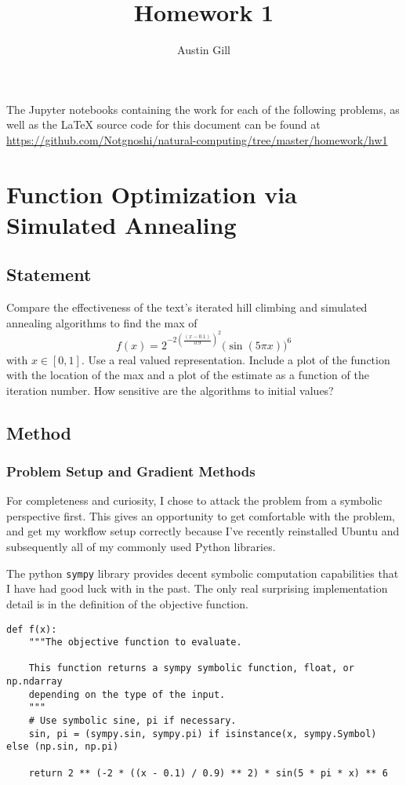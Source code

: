 \documentclass{article}
\title{Homework 1}
\author{Austin Gill}
\begin{document}
\maketitle
\tableofcontents
\newpage

The Jupyter notebooks containing the work for each of the following problems, as well as the
\LaTeX{} source code for this document can be found at
\url{https://github.com/Notgnoshi/natural-computing/tree/master/homework/hw1}

\section{Function Optimization via Simulated Annealing}\label{prob:1}

\subsection{Statement}
Compare the effectiveness of the text's iterated hill climbing and simulated annealing algorithms
to find the max of
\[ f(x) = 2^{-2{\left(\frac{(x - 0.1)}{0.9}\right)}^2}{\big(\sin(5\pi x)\big)}^6\]
with $x\in [0,1]$. Use a real valued representation. Include a plot of the function with the
location of the max and a plot of the estimate as a function of the iteration number. How sensitive
are the algorithms to initial values?

\subsection{Method}

\subsubsection{Problem Setup and Gradient Methods}

For completeness and curiosity, I chose to attack the problem from a symbolic perspective first.
This gives an opportunity to get comfortable with the problem, and get my workflow setup correctly
because I've recently reinstalled Ubuntu and subsequently all of my commonly used Python libraries.

The python \texttt{sympy} library provides decent symbolic computation capabilities
that I have had good luck with in the past. The only real surprising implementation detail is in
the definition of the objective function.

\begin{verbatim}
def f(x):
    """The objective function to evaluate.

    This function returns a sympy symbolic function, float, or np.ndarray
    depending on the type of the input.
    """
    # Use symbolic sine, pi if necessary.
    sin, pi = (sympy.sin, sympy.pi) if isinstance(x, sympy.Symbol) else (np.sin, np.pi)

    return 2 ** (-2 * ((x - 0.1) / 0.9) ** 2) * sin(5 * pi * x) ** 6
\end{verbatim}
\end{document}
